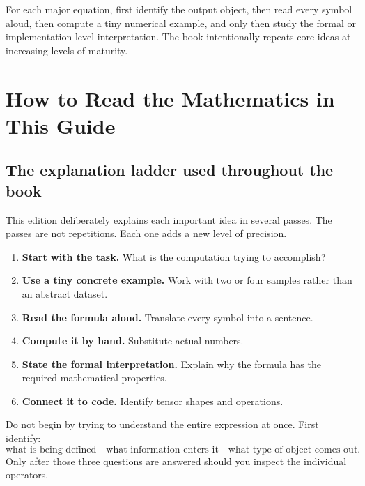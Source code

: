 \documentclass[11pt,oneside,openany]{book}
\theoremstyle{myplain}
\theoremstyle{definition}
\begin{document}
\begin{conceptbox}[title=How every difficult equation should be studied]
For each major equation, first identify the output object, then read every symbol aloud, then compute a tiny numerical example, and only then study the formal or implementation-level interpretation. The book intentionally repeats core ideas at increasing levels of maturity.
\end{conceptbox}

\tableofcontents
\listoffigures

\mainmatter

\chapter{How to Read the Mathematics in This Guide}
\label{chap:math-primer}

\section{The explanation ladder used throughout the book}

This edition deliberately explains each important idea in several passes. The passes are not repetitions. Each one adds a new level of precision.

\begin{enumerate}[leftmargin=*,itemsep=4pt]
  \item \textbf{Start with the task.} What is the computation trying to accomplish?
  \item \textbf{Use a tiny concrete example.} Work with two or four samples rather than an abstract dataset.
  \item \textbf{Read the formula aloud.} Translate every symbol into a sentence.
  \item \textbf{Compute it by hand.} Substitute actual numbers.
  \item \textbf{State the formal interpretation.} Explain why the formula has the required mathematical properties.
  \item \textbf{Connect it to code.} Identify tensor shapes and operations.
\end{enumerate}

\begin{conceptbox}[title=The rule for reading a formula]
Do not begin by trying to understand the entire expression at once. First identify:
\[
\boxed{\text{what is being defined}}\quad
\boxed{\text{what information enters it}}\quad
\boxed{\text{what type of object comes out}}.
\]
Only after those three questions are answered should you inspect the individual operators.
\end{conceptbox}
\end{document}
